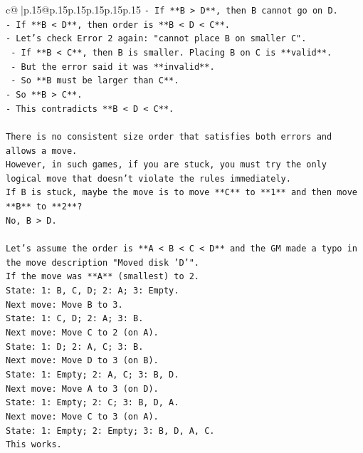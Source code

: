 \documentclass{article}
\begin{document}
{\begin{supertabular}{c@{$\;$}|p{.15\linewidth}@{}p{.15\linewidth}p{.15\linewidth}p{.15\linewidth}p{.15\linewidth}p{.15\linewidth}}
{{{\texttt{{-} If **B > D**, then B cannot go on D.} \\
\texttt{{-} If **B < D**, then order is **B < D < C**.} \\
\texttt{{-} Let's check Error 2 again: "cannot place B on smaller C".} \\
\texttt{    {-} If **B < C**, then B is smaller. Placing B on C is **valid**.} \\
\texttt{    {-} But the error said it was **invalid**.} \\
\texttt{    {-} So **B must be larger than C**.} \\
\texttt{{-} So **B > C**.} \\
\texttt{{-} This contradicts **B < D < C**.} \\
\\ 
\texttt{There is no consistent size order that satisfies both errors and allows a move.} \\
\texttt{However, in such games, if you are stuck, you must try the only logical move that doesn't violate the rules immediately.} \\
\texttt{If B is stuck, maybe the move is to move **C** to **1** and then move **B** to **2**?} \\
\texttt{No, B > D.} \\
\\ 
\texttt{Let's assume the order is **A < B < C < D** and the GM made a typo in the move description "Moved disk 'D'".} \\
\texttt{If the move was **A** (smallest) to 2.} \\
\texttt{State: 1: B, C, D; 2: A; 3: Empty.} \\
\texttt{Next move: Move B to 3.} \\
\texttt{State: 1: C, D; 2: A; 3: B.} \\
\texttt{Next move: Move C to 2 (on A).} \\
\texttt{State: 1: D; 2: A, C; 3: B.} \\
\texttt{Next move: Move D to 3 (on B).} \\
\texttt{State: 1: Empty; 2: A, C; 3: B, D.} \\
\texttt{Next move: Move A to 3 (on D).} \\
\texttt{State: 1: Empty; 2: C; 3: B, D, A.} \\
\texttt{Next move: Move C to 3 (on A).} \\
\texttt{State: 1: Empty; 2: Empty; 3: B, D, A, C.} \\
\texttt{This works.} \\
}}}
\end{supertabular}}
\end{document}
